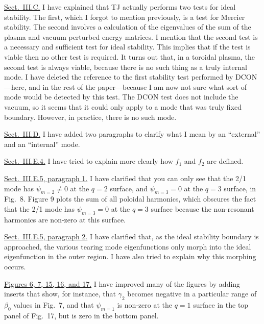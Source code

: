 \documentclass{article}[12pt]
\begin{document}
\begin{description}
\item \underline{Sect.~III.C.}  I have explained that TJ actually performs two tests for ideal stability. The first, which I forgot to mention previously,
is a test for Mercier stability. The second involves a calculation of the eigenvalues of the sum of the plasma and vacuum perturbed energy matrices. I mention that
the second test is a necessary and sufficient test for ideal stability. This implies that if the test is viable then no other test is required. 
It turns out that, in a toroidal plasma, the second test is always viable, because there is no such thing as a truly internal mode. 
I have deleted the reference to the first stability test performed by DCON---here, and in the rest of the paper---because I am now not sure what sort of mode would be
detected by this test. The DCON test does not include the vacuum, so it seems that it could only apply to a mode that was truly fixed boundary. However,
in practice, there is no such mode. 

\item \underline{Sect.~III.D.} I have added two paragraphs to clarify what I mean by an ``external'' and an ``internal'' mode. 

\item \underline{Sect.~III.E.4.} I have tried to explain more clearly how $f_1$ and $f_2$ are defined.

\item \underline{Sect.~III.E.5, paragraph 1.}  I have clarified that you can only see that the 2/1 mode has $\psi_{m=2}\neq 0$ at the $q=2$ surface, and $\psi_{m=3}=0$ at the $q=3$ surface, in Fig.~8. 
Figure 9 plots the sum of all poloidal harmonics, which obscures the fact that the 2/1 mode has  $\psi_{m=3}=0$ at the $q=3$ surface because the non-resonant harmonics are
non-zero at this surface. 

\item \underline{Sect.~III.E.5, paragraph 2.}  I have clarified that, as the ideal stability boundary is approached, the various tearing mode eigenfunctions only
morph into the ideal eigenfunction in the outer region. I have also tried to explain why this morphing occurs. 

\item \underline{Figures 6, 7, 15, 16, and 17.} I have improved many of the figures by adding inserts that show, for instance, that $\gamma_2$ becomes negative in a particular range of $\beta_0$ values in Fig.~7, and that
$\psi_{m=1}$ is non-zero at the $q=1$ surface in the top panel of Fig.~17, but is zero in the bottom panel. 


\end{description}
\end{document}
